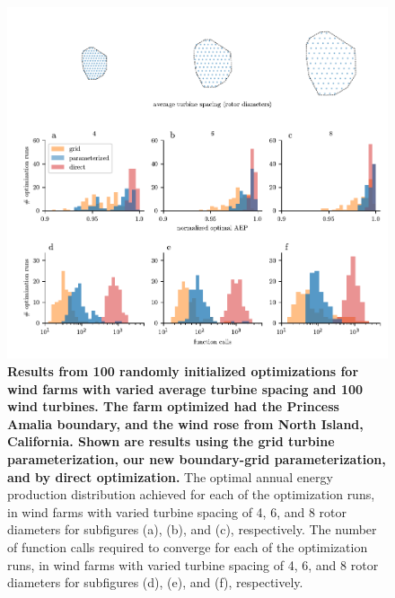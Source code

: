 \documentclass[wes, manuscript]{copernicus}
\begin{document}
\begin{figure}
\centering
\includegraphics{paper-figures/results_spacing.pdf}
\caption{\textbf{Results from 100 randomly initialized optimizations for wind farms with varied average turbine spacing and 100 wind turbines. The farm optimized had the Princess Amalia boundary, and the wind rose from North Island, California. Shown are results using the grid turbine parameterization, our new boundary-grid parameterization, and by direct optimization.} The optimal annual energy production distribution achieved for each of the optimization runs, in wind farms with varied turbine spacing of 4, 6, and 8 rotor diameters for subfigures (a), (b), and (c), respectively. The number of function calls required to converge for each of the optimization runs, in wind farms with varied turbine spacing of 4, 6, and 8 rotor diameters for subfigures (d), (e), and (f), respectively. }
\label{results-spacing}
\end{figure}
\end{document}
